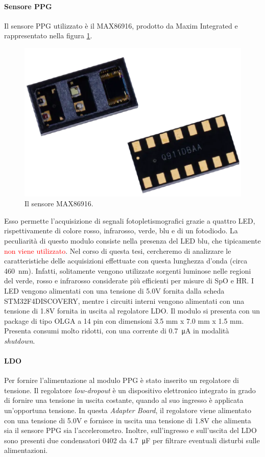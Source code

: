 \paragraph{Sensore PPG} Il sensore PPG utilizzato è il MAX86916, prodotto da Maxim Integrated e rappresentato nella figura \ref{fig:ImmagineMAX86916}.
\begin{figure}[b]
	\centering
	\includegraphics[width=0.6\linewidth]{ImageFiles/Hardware/ImmagineMAX86916}
	\caption{Il sensore MAX86916.}
	\label{fig:ImmagineMAX86916}
\end{figure}
Esso permette l'acquisizione di segnali fotopletismografici grazie a quattro LED, rispettivamente di colore rosso, infrarosso, verde, blu e di un fotodiodo. La peculiarità di questo modulo consiste nella presenza del LED blu, che tipicamente \textcolor{red}{non viene utilizzato}. Nel corso di questa tesi, cercheremo di analizzare le caratteristiche delle acquisizioni effettuate con questa lunghezza d'onda (circa \SI{460}{\nano\meter}). Infatti, solitamente vengono utilizzate sorgenti luminose nelle regioni del verde, rosso e infrarosso considerate più efficienti per misure di SpO e HR. I LED vengono alimentati con una tensione di 5.0V fornita dalla scheda STM32F4DISCOVERY, mentre i circuiti interni vengono alimentati con una tensione di 1.8V fornita in uscita al regolatore LDO. Il modulo si presenta con un package di tipo OLGA a 14 pin con dimensioni 3.5 mm x 7.0 mm x 1.5 mm. Presenta consumi molto ridotti, con una corrente di \SI{0.7}{\micro\ampere} in modalità \textit{shutdown}.

\paragraph{LDO} Per fornire l'alimentazione al modulo PPG è stato inserito un regolatore di tensione. Il regolatore \textit{low-dropout} è un dispositivo elettronico integrato in grado di fornire una tensione in uscita costante, quando al suo ingresso è applicata un'opportuna tensione\cite{Horowitz2015}. In questa \textit{Adapter Board}, il regolatore viene alimentato con una tensione di 5.0V e fornisce in uscita una tensione di 1.8V che alimenta sia il sensore PPG sia l'accelerometro. Inoltre, sull'ingresso e sull'uscita del LDO sono presenti due condensatori 0402 da \SI{4.7}{\micro\farad} per filtrare eventuali disturbi sulle alimentazioni.

